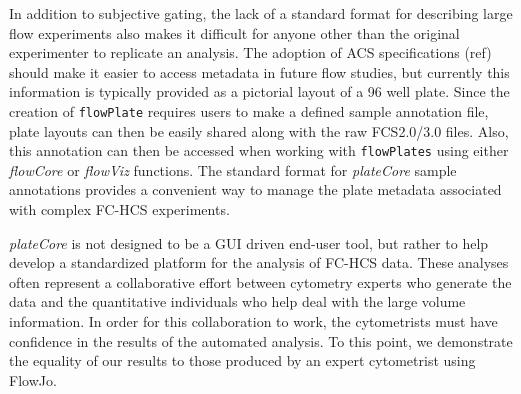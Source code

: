 \documentclass[12pt]{article}
\newcommand{\Rclass}[1]{{\texttt{#1}}}
\newcommand{\Robject}[1]{{\texttt{#1}}}
\newcommand{\Rpackage}[1]{{\textit{#1}}}
\begin{document}
In addition to subjective gating, the lack of a standard format for describing large flow experiments also
makes it difficult for anyone other than the original experimenter to replicate an analysis. 
The adoption of ACS specifications (ref) should make it easier to access metadata in future flow studies, but currently
this information is typically provided as a pictorial layout of a 96 well plate. 
Since the creation of \Robject{flowPlate} requires users to make a defined sample annotation file, plate layouts
can then be easily shared along with the raw FCS2.0/3.0 files. Also, this annotation can then be accessed
when working with \Robject{flowPlates} using either \Rpackage{flowCore} or \Rpackage{flowViz} functions.
The standard format for \Rpackage{plateCore} sample annotations provides a convenient way to manage the plate metadata
associated with complex FC-HCS experiments.

\Rpackage{plateCore} is not designed to be a GUI driven end-user tool, but rather to help develop a standardized platform for the analysis of FC-HCS data.
These analyses often represent a collaborative effort between cytometry experts who generate the data and the quantitative individuals who help
deal with the large volume information. In order for this collaboration to work, the cytometrists must have confidence in the
results of the automated analysis. To this point, we demonstrate the equality of our results to those produced by an expert
cytometrist using FlowJo\texttrademark.

\end{document}
